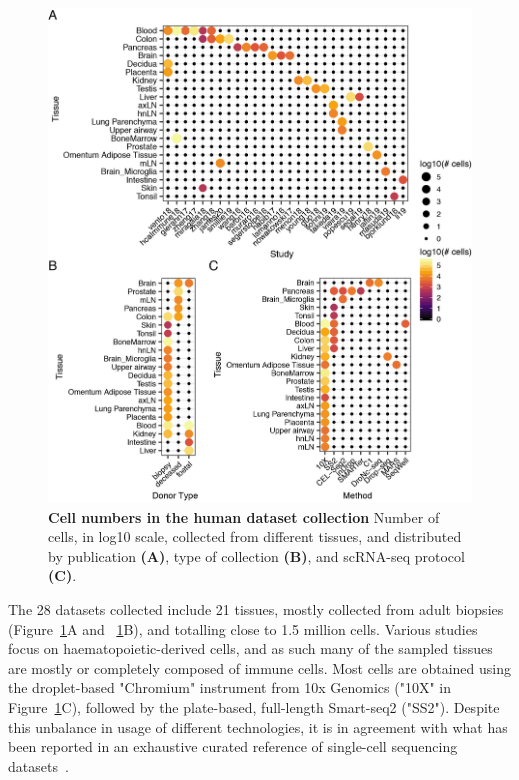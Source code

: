 \begin{figure}[ht!]
    \centering    
    \includegraphics[width=1.0\textwidth]{Chapter4/Figs/chap4_countsHumanAtlas.png} %
    \caption[Cell numbers in the human dataset collection]{\textbf{Cell numbers in the human dataset collection} \newline Number of cells, in log10 scale, collected from different tissues, and distributed by publication \textbf{(A)}, type of collection \textbf{(B)}, and scRNA-seq protocol \textbf{(C)}.}
    \label{fig:chap4_cha}
\end{figure}

The 28 datasets collected include 21 tissues, mostly collected from adult biopsies (Figure~\ref{fig:chap4_cha}A and ~\ref{fig:chap4_cha}B), and totalling close to 1.5 million cells. Various studies focus on haematopoietic-derived cells, and as such many of the sampled tissues are mostly or completely composed of immune cells. Most cells are obtained using the droplet-based "Chromium" instrument from 10x Genomics ("10X" in Figure~\ref{fig:chap4_cha}C), followed by the plate-based, full-length Smart-seq2 ("SS2"). Despite this unbalance in usage of different technologies, it is in agreement with what has been reported in an exhaustive curated reference of single-cell sequencing datasets~\citep{svensson_curated_2019}.

